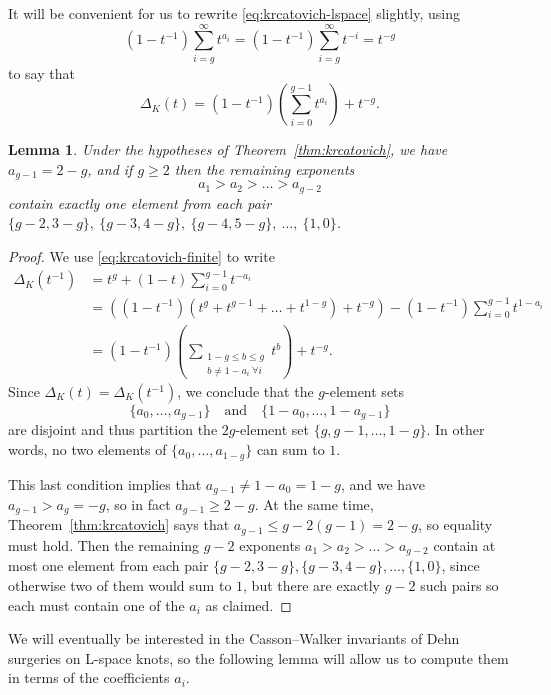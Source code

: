 \documentclass[11pt]{amsart}
\newtheorem {lemma}[theorem]{Lemma}
\numberwithin{equation}{section}
\numberwithin{theorem}{section}
\theoremstyle{definition}
\begin{document}
It will be convenient for us to rewrite \eqref{eq:krcatovich-lspace} slightly, using 
\[ (1-t^{-1})\sum_{i=g}^\infty t^{a_i} = (1-t^{-1})\sum_{i=g}^\infty t^{-i} = t^{-g} \]
to say that
\begin{equation} \label{eq:krcatovich-finite}
\Delta_K(t) = (1-t^{-1}) \left(\sum_{i=0}^{g-1} t^{a_i}\right) + t^{-g}.
\end{equation}

\begin{lemma} \label{lem:other-alexander-restrictions}
Under the hypotheses of Theorem~\ref{thm:krcatovich}, we have $a_{g-1} = 2-g$, and if $g \geq 2$ then the remaining exponents
\[ a_1 > a_2 > \dots > a_{g-2} \]
contain exactly one element from each pair $\{g-2,3-g\},\ \{g-3,4-g\},\ \{g-4,5-g\},\ \dots,\ \{1,0\}$.
\end{lemma}

\begin{proof}
We use \eqref{eq:krcatovich-finite} to write
\begin{align*}
\Delta_K(t^{-1}) &= t^g + (1-t)\sum_{i=0}^{g-1} t^{-a_i} \\
&= \left( (1-t^{-1})(t^g + t^{g-1} + \dots + t^{1-g}) + t^{-g} \right) - (1-t^{-1})\sum_{i=0}^{g-1} t^{1-a_i} \\
&= (1-t^{-1})\left(\sum_{\substack{1-g \leq b \leq g \\ b \neq 1-a_i\ \forall i}} t^b\right) + t^{-g}.
\end{align*}
Since $\Delta_K(t) = \Delta_K(t^{-1})$, we conclude that the $g$-element sets
\[ \{a_0,\dots,a_{g-1}\} \quad\text{and}\quad \{1-a_0,\dots,1-a_{g-1}\} \]
are disjoint and thus partition the $2g$-element set $\{g,g-1,\dots,1-g\}$.  In other words, no two elements of $\{a_0,\dots,a_{1-g}\}$ can sum to $1$.

This last condition implies that $a_{g-1} \neq 1-a_0 = 1-g$, and we have $a_{g-1} > a_g = -g$, so in fact $a_{g-1} \geq 2-g$.  At the same time, Theorem~\ref{thm:krcatovich} says that $a_{g-1} \leq g-2(g-1) = 2-g$, so equality must hold.  Then the remaining $g-2$ exponents $a_1 > a_2 > \dots > a_{g-2}$ contain at most one element from each pair $\{g-2,3-g\}, \{g-3,4-g\}, \dots, \{1,0\}$, since otherwise two of them would sum to $1$, but there are exactly $g-2$ such pairs so each must contain one of the $a_i$ as claimed.
\end{proof}

We will eventually be interested in the Casson--Walker invariants \cite{walker} of Dehn surgeries on L-space knots, so the following lemma will allow us to compute them in terms of the coefficients $a_i$.
\end{document}
